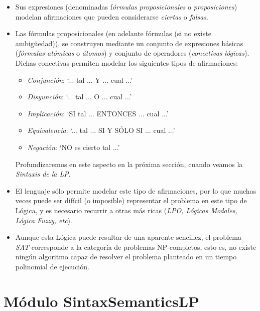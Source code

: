 \documentclass[a4paper]{report}
\begin{document}
\begin{itemize}
\item Sus expresiones (denominadas f\textit{órmulas proposicionales} o \textit{proposiciones}) modelan afirmaciones que pueden considerarse \textit{ciertas} o \textit{falsas}.

\item Las fórmulas proposicionales (en adelante fórmulas (si no existe ambigüedad)), se construyen mediante un conjunto de expresiones básicas (\textit{fórmulas atómicas} o \textit{átomos}) y conjunto de operadores (\textit{conectivas lógicas}). Dichas conectivas permiten modelar los siguientes tipos de afirmaciones:

\begin{itemize}
\item \textit{Conjunción}: `... tal ... Y ... cual ...'

\item \textit{Disyunción}: `... tal ... O ... cual ...'

\item \textit{Implicación}: `SI tal ... ENTONCES ... cual ...'

\item \textit{Equivalencia}: `... tal ... SI Y SÓLO SI ... cual ...'
\item \textit{Negación}: `NO es cierto tal ...'
\end{itemize}

Profundizaremos en este aspecto en la próxima sección, cuando veamos la \textit{Sintaxis de la LP}.

\item El lenguaje sólo permite modelar este tipo de afirmaciones, por lo que muchas veces puede ser difícil (o imposible) representar el problema en este tipo de Lógica, y es necesario recurrir a otras más ricas (\textit{LPO, Lógicas Modales, Lógica Fuzzy, etc}).

\item Aunque esta Lógica puede resultar de una aparente sencillez, el problema \textit{SAT} corresponde a la categoría de problemas NP-completos, esto es, no existe ningún algoritmo capaz de resolver el problema planteado en un tiempo polinomial de ejecución.

\end{itemize}

\section{Módulo SintaxSemanticsLP}
\end{document}
